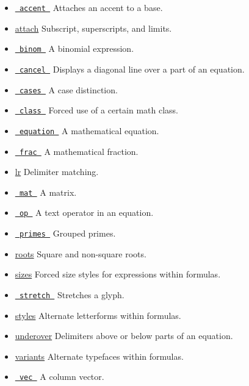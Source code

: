 \begin{itemize}
\tightlist
\item
  \href{/docs/reference/math/accent/}{\texttt{\ accent\ }} { Attaches an
  accent to a base. }
\item
  \href{/docs/reference/math/attach}{attach} { Subscript, superscripts,
  and limits. }
\item
  \href{/docs/reference/math/binom/}{\texttt{\ binom\ }} { A binomial
  expression. }
\item
  \href{/docs/reference/math/cancel/}{\texttt{\ cancel\ }} { Displays a
  diagonal line over a part of an equation. }
\item
  \href{/docs/reference/math/cases/}{\texttt{\ cases\ }} { A case
  distinction. }
\item
  \href{/docs/reference/math/class/}{\texttt{\ class\ }} { Forced use of
  a certain math class. }
\item
  \href{/docs/reference/math/equation/}{\texttt{\ equation\ }} { A
  mathematical equation. }
\item
  \href{/docs/reference/math/frac/}{\texttt{\ frac\ }} { A mathematical
  fraction. }
\item
  \href{/docs/reference/math/lr}{lr} { Delimiter matching. }
\item
  \href{/docs/reference/math/mat/}{\texttt{\ mat\ }} { A matrix. }
\item
  \href{/docs/reference/math/op/}{\texttt{\ op\ }} { A text operator in
  an equation. }
\item
  \href{/docs/reference/math/primes/}{\texttt{\ primes\ }} { Grouped
  primes. }
\item
  \href{/docs/reference/math/roots}{roots} { Square and non-square
  roots. }
\item
  \href{/docs/reference/math/sizes}{sizes} { Forced size styles for
  expressions within formulas. }
\item
  \href{/docs/reference/math/stretch/}{\texttt{\ stretch\ }} { Stretches
  a glyph. }
\item
  \href{/docs/reference/math/styles}{styles} { Alternate letterforms
  within formulas. }
\item
  \href{/docs/reference/math/underover}{underover} { Delimiters above or
  below parts of an equation. }
\item
  \href{/docs/reference/math/variants}{variants} { Alternate typefaces
  within formulas. }
\item
  \href{/docs/reference/math/vec/}{\texttt{\ vec\ }} { A column vector.
  }
\end{itemize}

